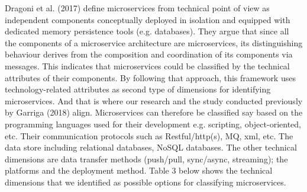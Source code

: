 \documentclass{article}
\begin{document}
Dragoni et al. (2017) define microservices from technical point of view as independent components conceptually deployed in isolation and equipped with dedicated memory persistence tools (e.g. databases). They argue that since all the components of a microservice architecture are microservices, its distinguishing behaviour derives from the composition and coordination of its components via messages. This indicates that microservices could be classified by the technical attributes of their components. By following that approach, this framework uses technology-related attributes as second type of dimensions for identifying microservices. And that is where our research and the study conducted previously by Garriga (2018) align. Microservices can therefore be classified say based on the programming languages used for their development e.g. scripting, object-oriented, etc. Their communication protocols such as Restful/http(s), MQ, xml, etc. The data store including relational databases, NoSQL databases. The other technical dimensions are data transfer methods (push/pull, sync/async, streaming); the platforms and the deployment method. Table 3 below shows the technical dimensions that we identified as possible options for classifying microservices.
\end{document}
